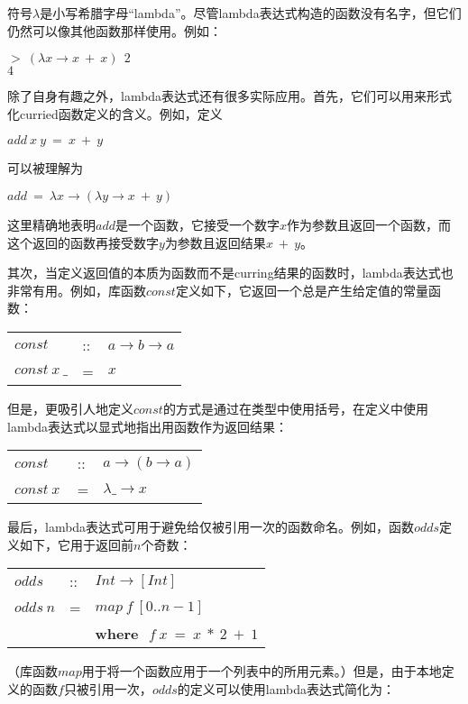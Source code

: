 符号$\lambda$是小写希腊字母“lambda”。尽管lambda表达式构造的函数没有名字，但它们仍然可以像其他函数那样使用。例如：

\noindent\hspace*{1cm} $>~(\lambda x \rightarrow x~+~x)~~2$\\
\hspace*{1cm} $4$

除了自身有趣之外，lambda表达式还有很多实际应用。首先，它们可以用来形式化curried函数定义的含义。例如，定义

\noindent\hspace*{1cm} $add~x~y~=~x~+~y$

可以被理解为

\noindent\hspace*{1cm} $add~=~\lambda x \rightarrow (\lambda y \rightarrow x~+~y)$

这里精确地表明$add$是一个函数，它接受一个数字$x$作为参数且返回一个函数，而这个返回的函数再接受数字$y$为参数且返回结果$x~+~y$。

其次，当定义返回值的本质为函数而不是curring结果的函数时，lambda表达式也非常有用。例如，库函数$const$定义如下，它返回一个总是产生给定值的常量函数：

\begin{tabular}[t]{lll}
$const$&::&$a \rightarrow b \rightarrow a$\\
$const~x~\_$&=&$x$\\
\end{tabular}

但是，更吸引人地定义$const$的方式是通过在类型中使用括号，在定义中使用lambda表达式以显式地指出用函数作为返回结果：

\begin{tabular}[t]{lll}
$const$&::&$a \rightarrow (b \rightarrow a)$\\
$const~x~$&=&$\lambda \_ \rightarrow x$\\
\end{tabular}

最后，lambda表达式可用于避免给仅被引用一次的函数命名。例如，函数$odds$定义如下，它用于返回前$n$个奇数：

\begin{tabular}[t]{lll}
$odds$&::&$Int \rightarrow [Int]$\\
$odds~n$&=&$map~f~[0..n-1]$\\
& &\textbf{where}~$~f~x~=~x~*~2~+~1$\\
\end{tabular}

（库函数$map$用于将一个函数应用于一个列表中的所用元素。）但是，由于本地定义的函数$f$只被引用一次，$odds$的定义可以使用lambda表达式简化为：


